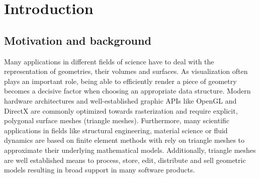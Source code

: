 \chapter{Introduction}
\label{ch:introduction}

\section{Motivation and background}
\label{sec:motivation}

Many applications in different fields of science have to deal with the representation of geometries, their volumes and surfaces.
As visualization often plays an important role, being able to efficiently render a piece of geometry becomes a decisive factor when choosing an appropriate data structure.
Modern hardware architectures and well-established graphic APIs like OpenGL and DirectX are commonly optimized towards rasterization and require explicit, polygonal surface meshes (\eg triangle meshes).
Furthermore, many scientific applications in fields like structural engineering, material science or fluid dynamics are based on finite element methods with rely on triangle meshes to approximate their underlying mathematical models.
Additionally, triangle meshes are well established means to process, store, edit, distribute and sell geometric models resulting in broad support in many software products.


